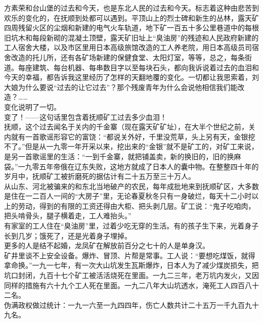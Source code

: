 方素荣和台山堡的过去和今天，也是东北人民的过去和今天。标志着这种由悲苦到欢乐的变化的，在抚顺到处都可以遇到。平顶山上的烈士碑和新生的丛林，露天矿四周残留火区的尘烟和新建的电气火车轨道，地下矿一百五十多公里巷道中的每根旧坑木和每段新砌的混凝土顶壁，露天矿旧址上“臭油房”的残迹和人民政府新建的工人宿舍大楼，以及市区里用日本高级旅馆改造的工人养老院，用日本高级员司宿舍改造的托儿所，还有各矿场新建的保健食堂、太阳灯室，等等，总之，每条街道。每座建筑、每台机器、每串数目字以至每块石头，都向我诉说着过去的血泪和今天的幸福，都告诉我这里经历了怎样的天翻地覆的变化。一切都让我思索着，刘大娘为什么要说“过去的让它过去”？那个残废青年为什么会说他相信我们能改造？……\\

变化说明了一切。\\

变了！——这句话里包含着抚顺矿工过去多少血泪！\\

抚顺，这个过去闻名于关内的千金寨（现在露天矿矿址），在大半个世纪之前，关内就有一首歌谣形容它的富饶：“都说关外好，千里没荒草，头上另有天，金银挖不了。”但是从一九零一年开采以来，挖出来的“金银”就不是矿工的，对矿工来说，是另一首歌谣里的生活：“一到千金寨，就把铺盖卖，新的换旧的，旧的换麻袋。”一九零五年帝俄在辽东失败，这地方就成了日本人的囊中物。在整整四十年的岁月中，抚顺矿工被折磨死的据估计有二十五万至三十万人。\\

从山东、河北被骗来的和东北当地破产的农民，每年成批地来到抚顺矿区，大多数是住在一二百人一间的“大房子”里，无论春夏秋冬只有一身破烂，每天十二小时以上的劳动，得到的有限的工资还得由大柜、把头剥几层。矿工说：“鬼子吃咱肉，把头啃骨头，腿子横着走，工人难抬头。”\\

有家室的工人住在“臭油房”里，过着少吃无穿的生活。有的孩子生下来，光着身子长到几岁；饿死了，还是光着身子埋掉。\\

更多的人是结不起婚，龙凤矿在解放前百分之七十的人是单身汉。\\

矿井里谈不上安全设备。爆炸、冒顶、片帮是常事。工人说：“要想吃煤饭，就得拿命换。”一九一七年，有一次大山坑发生瓦斯爆炸，日本人为了减少煤炭损失，把坑口封闭，九百十七个矿工被活活烧死在里面。一九二三年，老万坑内发火，又因同样的措施有六十九个工人死在里面。一九二八年大山坑透水，淹死工人四百八十二名。\\

伪满政权做过统计：一九一六至一九四四年，伤亡人数共计二十五万一千九百九十九名。\\


